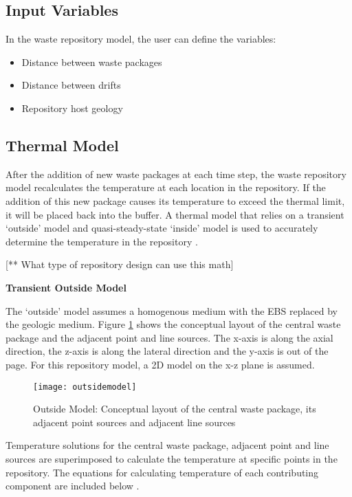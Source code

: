 \subsection{Input Variables}

In the waste repository model, the user can define the variables: 
	\begin{itemize}
		\item Distance between waste packages
		\item Distance between drifts 
		\item Repository host geology 
    \end{itemize}

\subsection{Thermal Model}
After the addition of new waste packages at each time step, the 
waste repository model recalculates the temperature at each location
in the repository. 
If the addition of this new package causes its temperature to exceed
the thermal limit, it will be placed back into the buffer. 
A thermal model that relies on a transient `outside' model and 
quasi-steady-state `inside' model is used to accurately determine 
the temperature in the repository \cite{sutton_investigations_2011}.

[** What type of repository design can use this math]

\noindent
\textbf{Transient Outside Model}

The `outside' model assumes a homogenous medium with the \gls{EBS} 
replaced by the geologic medium. 
Figure \ref{fig:conceptual_layout} shows the conceptual layout of 
the central waste package and the adjacent point and line sources. 
The x-axis is along the axial direction, the z-axis is along the 
lateral direction and the y-axis is out of the page. 
For this repository model, a 2D model on the x-z plane is assumed. 

\begin{figure}[h]
	\texttt{[image: outsidemodel]}
	\caption{Outside Model: Conceptual layout of the central waste 
	package, its adjacent point sources and adjacent line sources 
	\cite{sutton_investigations_2011}}
    \label{fig:conceptual_layout}
\end{figure}

Temperature solutions for the central waste package, adjacent point
and line sources are superimposed to calculate the temperature at 
specific points in the repository.
The equations for calculating temperature of each contributing 
component are included below \cite{sutton_investigations_2011,
greenberg_application_2012,huff_numerical_2012}. 


